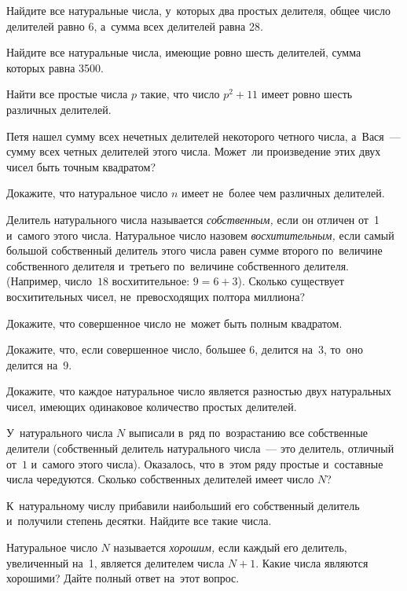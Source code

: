 \begin{problems}

\item
Найдите все натуральные числа, у~которых два простых делителя, общее число
делителей равно 6, а~сумма всех делителей равна 28.

\item
Найдите все натуральные числа, имеющие ровно шесть делителей, сумма которых
равна 3500.

\item
Найти все простые числа $p$ такие, что число $p^2 + 11$ имеет ровно шесть
различных делителей.

\item
Петя нашел сумму всех нечетных делителей некоторого четного числа,
а~Вася~--- сумму всех четных делителей этого числа.
Может~ли произведение этих двух чисел быть точным квадратом?

\item
Докажите, что натуральное число $n$ имеет не~более чем различных делителей.

\item
Делитель натурального числа называется \emph{собственным,} если он отличен
от~1 и~самого этого числа.
Натуральное число назовем \emph{восхитительным,} если самый большой
собственный делитель этого числа равен сумме второго по~величине собственного
делителя и~третьего по~величине собственного делителя.
(Например, число~$18$ восхитительное: $9 = 6 + 3$).
Сколько существует восхитительных чисел, не~превосходящих полтора миллиона?

\item
Докажите, что совершенное число не~может быть полным квадратом.

\item
Докажите, что, если совершенное число, большее 6, делится на~3, то~оно
делится на~9.

\item
Докажите, что каждое натуральное число является разностью двух натуральных
чисел, имеющих одинаковое количество простых делителей.

\item
У~натурального числа $N$ выписали в~ряд по~возрастанию все собственные
делители (собственный делитель натурального числа~--- это делитель, отличный
от~$1$ и~самого этого числа).
Оказалось, что в~этом ряду простые и~составные числа чередуются.
Сколько собственных делителей имеет число $N$?

\item
К~натуральному числу прибавили наибольший его собственный делитель и~получили
степень десятки.
Найдите все такие числа.

\item
Натуральное число $N$ называется \emph{хорошим,} если каждый его делитель,
увеличенный на~1, является делителем числа $N + 1$.
Какие числа являются хорошими?
Дайте полный ответ на~этот вопрос.

\end{problems}

